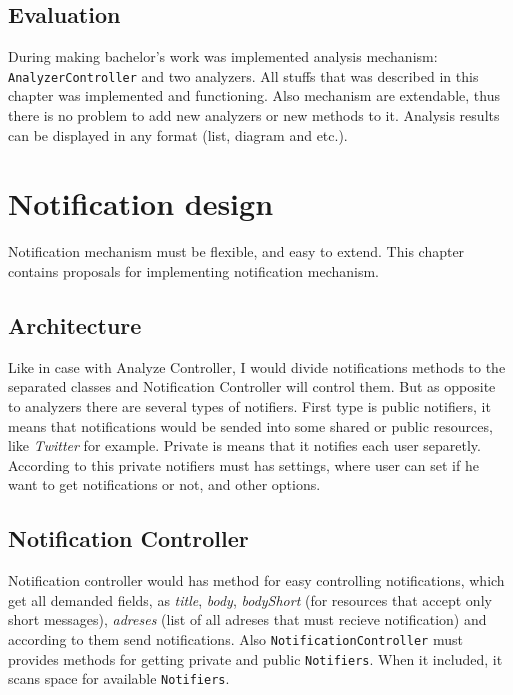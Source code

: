 \section{Evaluation}

During making bachelor's work was implemented analysis mechanism: \texttt{AnalyzerController} and two analyzers. All stuffs that was described in this chapter was implemented and functioning. Also mechanism are extendable, thus there is no problem to add new analyzers or new methods to it. Analysis results can be displayed in any format (list, diagram and etc.).

\chapter{Notification design}
\label{ch:notification_proposal}

Notification mechanism must be flexible, and easy to extend. This chapter contains proposals for implementing notification mechanism.

\section{Architecture}

Like in case with Analyze Controller, I would divide notifications methods to the separated classes and Notification Controller will control them. But as opposite to analyzers there are several types of notifiers. First type is public notifiers, it means that notifications would be sended into some shared or public resources, like \emph{Twitter} for example. Private is means that it notifies each user separetly. According to this private notifiers must has settings, where user can set if he want to get notifications or not, and other options.

\section{Notification Controller}

Notification controller would has method for easy controlling notifications, which get all demanded fields, as \emph{title}, \emph{body}, \emph{bodyShort} (for resources that accept only short messages), \emph{adreses} (list of all adreses that must recieve notification) and according to them send notifications. Also \texttt{NotificationController} must provides methods for getting private and public \texttt{Notifiers}. When it included, it scans space for available \texttt{Notifiers}.

